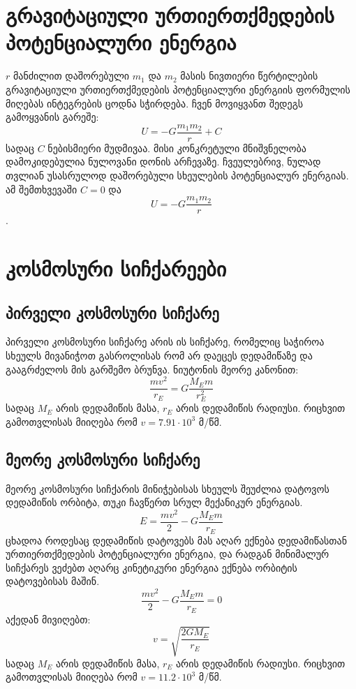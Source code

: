 \documentclass[a4paper]{article}
\begin{document}
	\section{გრავიტაციული ურთიერთქმედების პოტენციალური ენერგია}
	$r$ მანძილით დაშორებული $m_1$ და $m_2$ მასის ნივთიერი წერტილების გრავიტაციული ურთიერთქმედების პოტენციალური ენერგიის ფორმულის მიღებას ინტეგრების ცოდნა სჭირდება. ჩვენ მოვიყვანთ შედეგს გამოყვანის გარეშე:
	\begin{equation}
		U = -G\frac{m_1 m_2}{r} + C
	\end{equation}
სადაც $C$ ნებისმიერი მუდმივაა. მისი კონკრეტული მნიშვნელობა დამოკიდებულია ნულოვანი დონის არჩევაზე. ჩვეულებრივ, ნულად თვლიან
უსასრულოდ დაშორებული სხეულების პოტენციალურ ენერგიას. ამ შემთხვევაში	$C = 0$ და $$U = -G\frac{m_1 m_2}{r}$$.
	
	\section{კოსმოსური სიჩქარეები}
	\subsection{პირველი კოსმოსური სიჩქარე}
		პირველი კოსმოსური სიჩქარე არის ის სიჩქარე, რომელიც საჭიროა სხეულს მივანიჭოთ გასროლისას რომ არ დაეცეს დედამიწაზე და გააგრძელოს მის გარშემო ბრუნვა. ნიუტონის მეორე კანონით:
		\begin{equation}
			\frac{mv^2}{r_E} = G\frac{M_Em}{r_E^2}
		\end{equation}
სადაც $M_E$ არის დედამიწის მასა, $r_E$ არის დედამიწის რადიუსი. რიცხვით გამოთვლისას მიიღება რომ $v = 7.91 \cdot 10^3$ მ/წმ.

	\subsection{მეორე კოსმოსური სიჩქარე}
		მეორე კოსმოსური სიჩქარის მინიჭებისას სხეულს შეუძლია დატოვოს დედამიწის ორბიტა, თუკი ჩავწერთ სრულ მექანიკურ ენერგიას. 
			\begin{equation}
				E = \frac{mv^2}{2} - G\frac{M_E m}{r_E}
			\end{equation}
ცხადოა როდესაც დედამიწის დატოვებს მას აღარ ექნება დედამიწასთან ურთიერთქმედების პოტენციალური ენერგია, და რადგან მინიმალურ სიჩქარეს ვეძებთ აღარც კინეტიკური ენერგია ექნება ორბიტის დატოვებისას მაშინ.
			\begin{equation}
				\frac{mv^2}{2} - G\frac{M_E m}{r_E} = 0
			\end{equation}
აქედან მივიღებთ:
			\begin{equation}
				v = \sqrt{\frac{2GM_E}{r_E}}
			\end{equation}
სადაც $M_E$ არის დედამიწის მასა, $r_E$ არის დედამიწის რადიუსი. რიცხვით გამოთვლისას მიიღება რომ $v = 11.2 \cdot 10^3$ მ/წმ.
\end{document}
